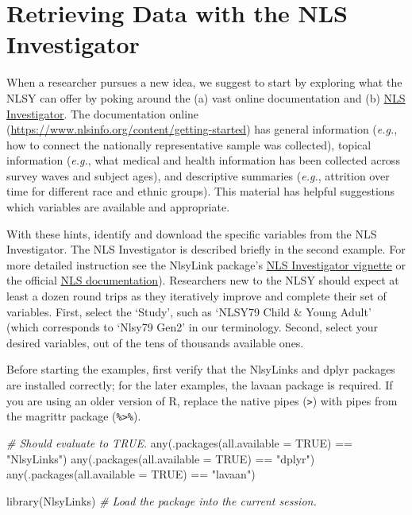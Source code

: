 \documentclass[smallextended]{svjour3}       %
\newenvironment{Shaded}{\begin{snugshade}}{\end{snugshade}}
\newcommand{\AttributeTok}[1]{\textcolor[rgb]{0.77,0.63,0.00}{#1}}
\newcommand{\CommentTok}[1]{\textcolor[rgb]{0.56,0.35,0.01}{\textit{#1}}}
\newcommand{\ConstantTok}[1]{\textcolor[rgb]{0.00,0.00,0.00}{#1}}
\newcommand{\FunctionTok}[1]{\textcolor[rgb]{0.00,0.00,0.00}{#1}}
\newcommand{\NormalTok}[1]{#1}
\newcommand{\SpecialCharTok}[1]{\textcolor[rgb]{0.00,0.00,0.00}{#1}}
\newcommand{\StringTok}[1]{\textcolor[rgb]{0.31,0.60,0.02}{#1}}
\begin{document}
\hypertarget{retrieving-data-with-the-nls-investigator}{%
\section{Retrieving Data with the NLS
Investigator}\label{retrieving-data-with-the-nls-investigator}}

When a researcher pursues a new idea, we suggest to start by exploring
what the NLSY can offer by poking around the (a) vast online
documentation and (b) \href{https://www.nlsinfo.org/investigator}{NLS
Investigator}. The documentation online
(\url{https://www.nlsinfo.org/content/getting-started}) has general
information (\emph{e.g.}, how to connect the nationally representative
sample was collected), topical information (\emph{e.g.}, what medical
and health information has been collected across survey waves and
subject ages), and descriptive summaries (\emph{e.g.}, attrition over
time for different race and ethnic groups). This material has helpful
suggestions which variables are available and appropriate.

With these hints, identify and download the specific variables from the
NLS Investigator. The NLS Investigator is described briefly in the
second example. For more detailed instruction see the NlsyLink package's
\href{https://nlsy-links.github.io/NlsyLinks/articles/nls-investigator.html}{NLS
Investigator vignette} or the official
\href{https://www.nlsinfo.org/content/access-data-investigator/investigator-user-guide}{NLS
documentation}). Researchers new to the NLSY should expect at least a
dozen round trips as they iteratively improve and complete their set of
variables. First, select the `Study', such as `NLSY79 Child \& Young
Adult' (which corresponds to `Nlsy79 Gen2' in our terminology. Second,
select your desired variables, out of the tens of thousands available
ones.

Before starting the examples, first verify that the NlsyLinks and dplyr
packages are installed correctly; for the later examples, the lavaan
package is required. If you are using an older version of R, replace the
native pipes (\texttt{\textbar{}\textgreater{}}) with pipes from the
magrittr package (\texttt{\%\textgreater{}\%}).

\begin{Shaded}
\begin{Highlighting}[]
\CommentTok{\# Should evaluate to TRUE.}
\FunctionTok{any}\NormalTok{(}\FunctionTok{.packages}\NormalTok{(}\AttributeTok{all.available =} \ConstantTok{TRUE}\NormalTok{) }\SpecialCharTok{==} \StringTok{"NlsyLinks"}\NormalTok{)}
\FunctionTok{any}\NormalTok{(}\FunctionTok{.packages}\NormalTok{(}\AttributeTok{all.available =} \ConstantTok{TRUE}\NormalTok{) }\SpecialCharTok{==} \StringTok{"dplyr"}\NormalTok{)}
\FunctionTok{any}\NormalTok{(}\FunctionTok{.packages}\NormalTok{(}\AttributeTok{all.available =} \ConstantTok{TRUE}\NormalTok{) }\SpecialCharTok{==} \StringTok{"lavaan"}\NormalTok{)}

\FunctionTok{library}\NormalTok{(NlsyLinks) }\CommentTok{\# Load the package into the current session.}
\end{Highlighting}
\end{Shaded}
\end{document}
